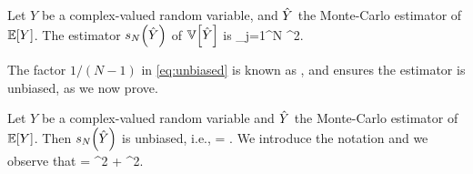 Let $Y$ be a complex-valued random variable, and $\hat{Y}$ the Monte-Carlo estimator of $\EXP{Y}$. The estimator $\unbiased{\Yhat}{N}$ of $\VAR{\Yhat}$ is
\beqs
{} \de {} \sum_{j=1}^N \abs{\Yj - \Yhat}^2.
\eeqs
\ede

The factor $1/(N-1)$ in \cref{eq:unbiased} is known as , and ensures the estimator is unbiased, as we now prove.

\label{lem:unbiased}
Let $Y$ be a complex-valued random variable and  $\hat{Y}$ the Monte-Carlo estimator of $\EXP{Y}$. Then $\unbiased{\Yhat}{N}$ is unbiased, i.e.,
\beqs
{} = \VAR{\Yhat}.
\eeqs
\ele
{}
We introduce the notation
\beqs
\mu \de {}\quad\tand\quad\sigma \de {}
\eeqs
and we observe that
\beq\label{eq:varrelation}
 = \sigma^2 + \mu^2.
\eeq

